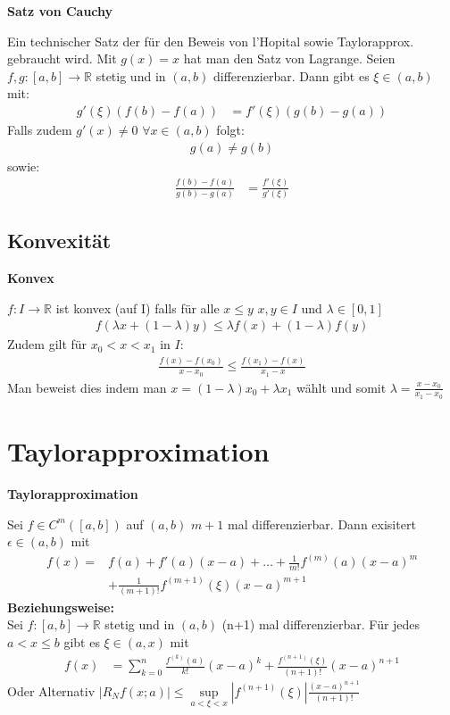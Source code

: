 \documentclass[25pt]{sciposter}
\newcommand{\R}{\mathbb{R}}
\newenvironment{method}[1]{\begin{mdframed}[backgroundcolor=blue!10,innertopmargin=15pt, innerbottommargin=15pt, nobreak=true]
		\textbf{#1 }
	}
	{ 
	\end{mdframed}
}
\begin{document}
\begin{multicols}{3}
\begin{method}{Satz von Cauchy}
	Ein technischer Satz der für den Beweis von l'Hopital sowie Taylorapprox. gebraucht wird. Mit $g(x)=x$ hat man den Satz von Lagrange. \newline
Seien $f,g:[a,b]\to \R$ stetig und in $(a,b)$ differenzierbar. Dann gibt es $\xi \in (a,b)$ mit:
\begin{align*}
	g'(\xi)(f(b)-f(a)) &= f'(\xi)(g(b) - g(a))
\end{align*}
Falls zudem $g'(x) \not = 0$ $\forall x \in (a,b)$ folgt:
\begin{align*}
	g(a) \not = g(b)
\end{align*}
sowie:
\begin{align*}
	\frac{f(b) - f(a)}{g(b) - g(a)} &= \frac{f'(\xi)}{g'(\xi)}
\end{align*}
\end{method}


\subsection*{Konvexität}

\begin{method}{Konvex}
	$f : I \to \R$ ist konvex (auf I) falls für alle $x \leq y$ $x,y \in I$ und $\lambda \in [0,1]$
	\begin{align*}
	f(\lambda x + (1-\lambda)y) \leq \lambda f(x) + (1-\lambda)f(y)
	\end{align*}
	Zudem gilt für $x_0 < x< x_1$ in $I$:
	\begin{align*}
	 \frac{f(x) - f(x_0)}{x-x_0} \leq \frac{f(x_1) - f(x)}{x_1 - x}
	\end{align*}
	Man beweist dies indem man $x = (1-\lambda) x_0 + \lambda x_1$ wählt und somit $\lambda = \frac{x-x_0}{x_1 - x_0}$
\end{method}

\section*{Taylorapproximation}

\begin{method}{Taylorapproximation}
Sei $f\in C^m ([a,b])$ auf $(a,b)$ $m+1$ mal differenzierbar. Dann exisitert $\epsilon \in (a,b)$ mit 
\begin{align*}
	f(x) =& f(a) + f'(a)(x-a) + \ldots + \frac{1}{m!} f^{(m)} (a) (x-a)^m\\ &+ \frac{1}{(m+1)!} f^{(m+1)}(\xi) (x-a)^{m+1}
\end{align*} 
 \textbf{Beziehungsweise:}\\
	Sei $f:[a,b] \to \R$ stetig und in $(a,b)$ (n+1) mal differenzierbar. Für jedes $a<x\leq b$ gibt es $\xi \in (a,x)$ mit
	\begin{align*}
	f(x) &= \sum_{k=0}^n \frac{f^{(k)}(a)}{k!} (x-a)^k + \frac{f^{(n+1)}(\xi)}{(n+1)!} (x-a)^{n+1}
	\end{align*}
Oder Alternativ $|R_N f(x;a)| \leq \sup\limits_{a < \xi < x} |f^{(n+1)} (\xi)|  \frac{(x-a)^{n+1}}{(n+1)!}$
\end{method}


\end{multicols}
\end{document}
